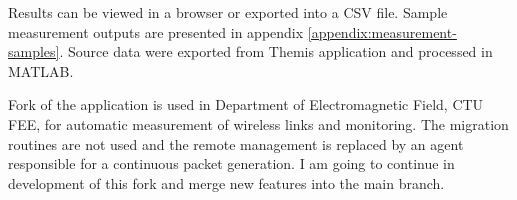 Results can be viewed in a browser or exported into a \Ac{CSV} file. Sample measurement outputs are presented in appendix \ref{appendix:measurement-samples}. Source data were exported from Themis application and processed in MATLAB.

Fork of the application is used in Department of Electromagnetic Field, CTU FEE, for automatic measurement of wireless links and monitoring. The migration routines are not used and the remote management is replaced by an agent responsible for a continuous packet generation. I am going to continue in development of this fork and merge new features into the main branch.
